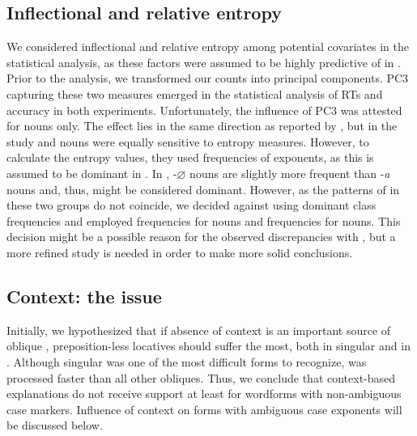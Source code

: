 \documentclass[output=paper, modfonts,newtxmath,hidelinks]{langscibook}
\begin{document}
\subsection{Inflectional and relative entropy} 
We considered inflectional and relative entropy among potential covariates in the statistical analysis, as these factors were assumed to be highly predictive of   in  \citep{milin2009simultaneous}. Prior to the analysis, we transformed our counts into principal components. PC3 capturing these two measures emerged in the statistical analysis of RTs and accuracy in both experiments. Unfortunately, the influence of PC3 was attested for  nouns only. The effect lies in the same direction as reported by \citet*{milin2009simultaneous}, but in the  study  and  nouns were equally sensitive to entropy measures. However, to calculate the entropy values, they used frequencies of  exponents, as this  is assumed to be dominant in . In ,  -$\varnothing$ nouns are slightly more frequent than  -\textit{a} nouns \citep{samojlova2014frequencies} and, thus, might be considered dominant. However, as the patterns of  in these two  groups do not coincide, we decided against using dominant class frequencies and employed  frequencies for  nouns and  frequencies for  nouns. This decision might be a possible reason for the observed discrepancies with \citet{milin2009simultaneous}, but a more refined study is needed in order to make more solid conclusions.\\

\subsection{Context: the  issue}
Initially, we hypothesized that if absence of context is an important source of oblique , preposition-less locatives should suffer the most, both in singular and in . Although   singular was one of the most difficult forms to recognize,   was processed faster than all other obliques. Thus, we conclude that context-based explanations do not receive support at least for wordforms with non-ambiguous case markers. Influence of context on forms with ambiguous case exponents will be discussed below.\\
\end{document}
